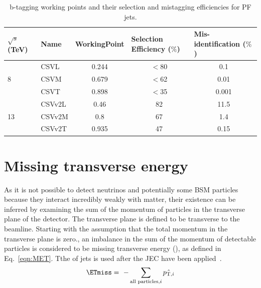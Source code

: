 \begin{table}[htpb!]
\footnotesize
\begin{center}
\begin{tabular}{l|l|c|c|c}
$\sqrt{s}$ (TeV)    & Name   & \multicolumn{1}{l|}{WorkingPoint} & \multicolumn{1}{l|}{Selection Efficiency ($\%$)} & \multicolumn{1}{l}{Mis-identification ($\%$)} \\ \hline
\multirow{3}{*}{8}  & CSVL   & 0.244                             & $<$80                                                 & 0.1                                               \\ \cline{2-5} 
                    & CSVM   & 0.679                             & $<$62                                                 & 0.01                                   \\ \cline{2-5} 
                    & CSVT   & 0.898                             & $<$35                                               & 0.001                                               \\ \hline
\multirow{3}{*}{13} & CSVv2L & 0.46                              & 82                                               & 11.5                                          \\ \cline{2-5} 
                    & CSVv2M & 0.8                               & 67                                               & 1.4                                           \\ \cline{2-5} 
                    & CSVv2T & 0.935                             & 47                                               & 0.15                                         
\end{tabular}
\caption{b-tagging working points and their selection and mistagging efficiencies for PF jets.}
\label{tab:btag}
\end{center}
\end{table}


\section{Missing transverse energy ~\label{sec:METreco}}
As it is not possible to detect neutrinos and potentially some BSM particles because they interact incredibly weakly with matter, their existence can be inferred by examining the sum of the momentum of particles in the transverse plane of the detector. The transverse plane is defined to be transverse to the beamline. Starting with the assumption that the total momentum in the transverse plane is zero., an imbalance in the sum of the momentum of detectable particles is considered to be missing transverse energy (\ETmiss), as defined in Eq.~\ref{eqn:MET}. Tthe \pt of jets is used after the JEC have been applied~\cite{CMS:2016ljj}.
\begin{equation}
\ETmiss = ~- \sum_{\textrm{all particles,}i} \hat{ {p}_{\textrm{T},i} }
\label{eqn:MET}
\end{equation}


